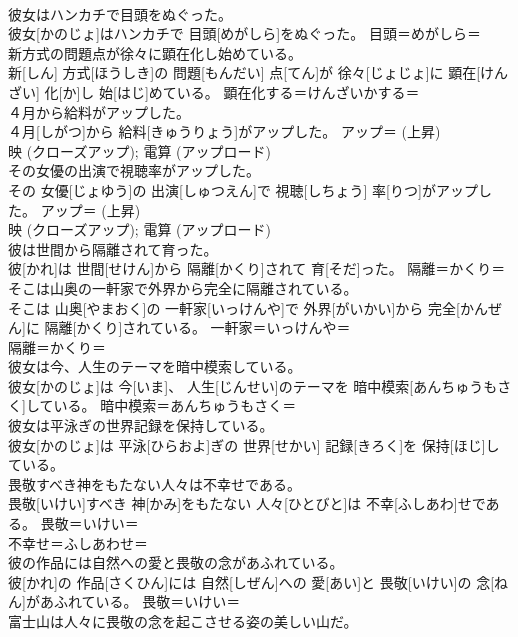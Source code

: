 \documentclass[8pt]{extreport}
\begin{document}
\begin{CJK}{UTF8}{min}
{\\	彼女はハンカチで目頭をぬぐった。	
\\	彼女[かのじょ]はハンカチで 目頭[めがしら]をぬぐった。	目頭＝めがしら＝ 
\\	新方式の問題点が徐々に顕在化し始めている。	
\\	新[しん] 方式[ほうしき]の 問題[もんだい] 点[てん]が 徐々[じょじょ]に 顕在[けんざい] 化[か]し 始[はじ]めている。	顕在化する＝けんざいかする＝ 
\\	４月から給料がアップした。	
\\	４月[しがつ]から 給料[きゅうりょう]がアップした。	アップ＝ (上昇) 
\\	{映} (クローズアップ); {電算} (アップロード)
\\	その女優の出演で視聴率がアップした。	
\\	その 女優[じょゆう]の 出演[しゅつえん]で 視聴[しちょう] 率[りつ]がアップした。	アップ＝ (上昇) 
\\	{映} (クローズアップ); {電算} (アップロード)
\\	彼は世間から隔離されて育った。	
\\	彼[かれ]は 世間[せけん]から 隔離[かくり]されて 育[そだ]った。	隔離＝かくり＝ 
\\	そこは山奥の一軒家で外界から完全に隔離されている。	
\\	そこは 山奥[やまおく]の 一軒家[いっけんや]で 外界[がいかい]から 完全[かんぜん]に 隔離[かくり]されている。	一軒家＝いっけんや＝ 
\\	隔離＝かくり＝ 
\\	彼女は今、人生のテーマを暗中模索している。	
\\	彼女[かのじょ]は 今[いま]、 人生[じんせい]のテーマを 暗中模索[あんちゅうもさく]している。	暗中模索＝あんちゅうもさく＝ 
\\	彼女は平泳ぎの世界記録を保持している。	
\\	彼女[かのじょ]は 平泳[ひらおよ]ぎの 世界[せかい] 記録[きろく]を 保持[ほじ]している。	
\\	畏敬すべき神をもたない人々は不幸せである。	
\\	畏敬[いけい]すべき 神[かみ]をもたない 人々[ひとびと]は 不幸[ふしあわ]せである。	畏敬＝いけい＝ 
\\	不幸せ＝ふしあわせ＝ 
\\	彼の作品には自然への愛と畏敬の念があふれている。	
\\	彼[かれ]の 作品[さくひん]には 自然[しぜん]への 愛[あい]と 畏敬[いけい]の 念[ねん]があふれている。	畏敬＝いけい＝ 
\\	富士山は人々に畏敬の念を起こさせる姿の美しい山だ。	
}
\end{CJK}
\end{document}
